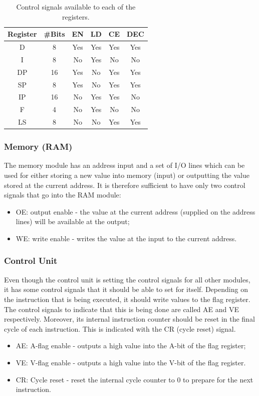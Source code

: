 \begin{table}[H]
  \centering
  \begin{tabular}{c|c|c|c|c|c}
    Register & \#Bits & EN  & LD  & CE  & DEC \\ \hline 
    D        & 8     & Yes & Yes & Yes & Yes \\
    I        & 8     & No  & Yes & No  & No  \\
    DP       & 16    & Yes & No  & Yes & Yes \\ 
    SP       & 8     & Yes & No  & Yes & Yes \\ 
    IP       & 16    & No  & Yes & Yes & No  \\ 
    F        & 4     & No  & Yes & No  & No  \\ 
    LS       & 8     & No  & No  & Yes & Yes \\ 
  \end{tabular}
  \caption{Control signals available to each of the registers.}
  \label{tab:registers}
\end{table}

\subsubsection{Memory (RAM)}
The memory module has an address input and a set of I/O lines which can be used for either storing a new value into memory (input) or outputting the value stored at the current address. It is therefore sufficient to have only two control signals that go into the RAM module:
\begin{itemize}
\item OE: output enable - the value at the current address (supplied on the address lines) will be available at the output;
\item WE: write enable - writes the value at the input to the current address.
\end{itemize}

\subsubsection{Control Unit}
Even though the control unit is setting the control signals for all other modules, it has some control signals that it should be able to set for itself. Depending on the instruction that is being executed, it should write values to the flag register. The control signals to indicate that this is being done are called AE and VE respectively. Moreover, its internal instruction counter should be reset in the final cycle of each instruction. This is indicated with the CR (cycle reset) signal.
\begin{itemize}
\item AE: A-flag enable - outputs a high value into the A-bit of the flag register;
\item VE: V-flag enable - outputs a high value into the V-bit of the flag register.
\item CR: Cycle reset - reset the internal cycle counter to 0 to prepare for the next instruction.
\end{itemize}


